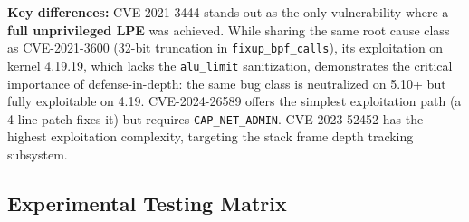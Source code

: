 \textbf{Key differences:} CVE-2021-3444 stands out as the only vulnerability where a \textbf{full unprivileged LPE} was achieved. While sharing the same root cause class as CVE-2021-3600 (32-bit truncation in \texttt{fixup\_bpf\_calls}), its exploitation on kernel 4.19.19, which lacks the \texttt{alu\_limit} sanitization, demonstrates the critical importance of defense-in-depth: the same bug class is neutralized on 5.10+ but fully exploitable on 4.19. CVE-2024-26589 offers the simplest exploitation path (a 4-line patch fixes it) but requires \texttt{CAP\_NET\_ADMIN}. CVE-2023-52452 has the highest exploitation complexity, targeting the stack frame depth tracking subsystem.

\subsection{Experimental Testing Matrix}

